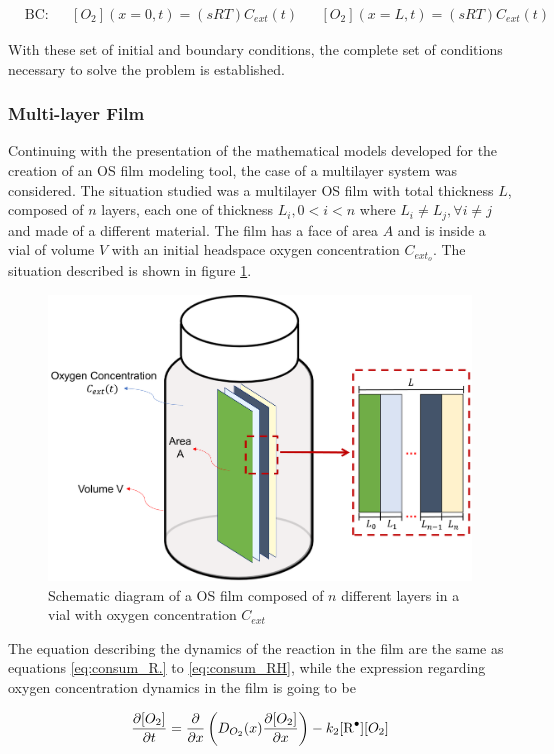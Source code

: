 \begin{refsection}
\begin{align}
    &\text{BC:} & &[O_2](x=0, t)= \left(sRT\right) C_{ext}(t) & & [O_2](x=L, t)= \left(sRT\right) C_{ext}(t)
    \label{eq:bc_mono_film}
\end{align}

With these set of initial and boundary conditions, the complete set of conditions necessary to solve the problem is established.

\subsubsection{Multi-layer Film}
Continuing with the presentation of the mathematical models developed for the creation of an OS film modeling tool, the case of a multilayer system was considered. The situation studied was a multilayer OS film with total thickness $L$,  composed of  $n$ layers, each one of thickness $L_i, 0<i<n$ where  $L_i\neq L_j, \forall  i\neq j$ and made of a different material. The film has a face of area $A$ and is inside a vial of volume $V$ with an initial headspace oxygen concentration $C_{ext_o}$. The situation described is shown in figure \ref{fig:model_multilayer_diagram}.

\begin{figure}[ht]
    \centering
    \includegraphics[width=0.62\linewidth]{Documento_Latex/Imagenes/modelo_multicapa.png}
    \caption{Schematic diagram of a OS film composed of $n$ different layers in a vial with oxygen concentration $C_{ext}$}
    \label{fig:model_multilayer_diagram}
\end{figure}

The equation describing the dynamics of the reaction in the film are the same as equations \ref{eq:consum_R.} to \ref{eq:consum_RH}, while the expression regarding oxygen concentration dynamics in the film is going to be

\begin{equation}
    \frac{\partial [O_2]}{\partial t}= \frac{\partial}{\partial x} \left(D_{O_2}(x) \frac{\partial [O_2] }{\partial x}\right) -k_2[\ce{R^.}][O_2]
    \label{eq:mass_bal_def_multi}
\end{equation}


\end{refsection}

